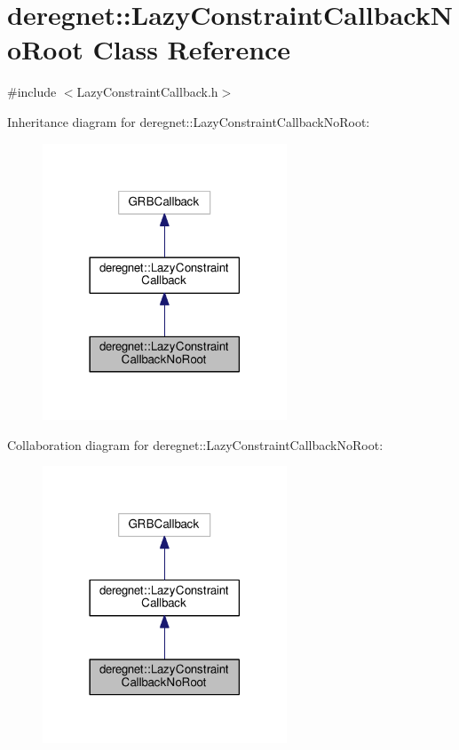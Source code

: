 \hypertarget{classderegnet_1_1LazyConstraintCallbackNoRoot}{}\section{deregnet\+:\+:Lazy\+Constraint\+Callback\+No\+Root Class Reference}
\label{classderegnet_1_1LazyConstraintCallbackNoRoot}


{\ttfamily \#include $<$Lazy\+Constraint\+Callback.\+h$>$}



Inheritance diagram for deregnet\+:\+:Lazy\+Constraint\+Callback\+No\+Root\+:\nopagebreak
\begin{figure}[H]
\begin{center}
\leavevmode
\includegraphics[width=206pt]{classderegnet_1_1LazyConstraintCallbackNoRoot__inherit__graph}
\end{center}
\end{figure}


Collaboration diagram for deregnet\+:\+:Lazy\+Constraint\+Callback\+No\+Root\+:\nopagebreak
\begin{figure}[H]
\begin{center}
\leavevmode
\includegraphics[width=206pt]{classderegnet_1_1LazyConstraintCallbackNoRoot__coll__graph}
\end{center}
\end{figure}
